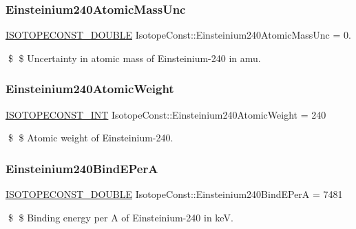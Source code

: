 \subsubsection{\texorpdfstring{Einsteinium240\+Atomic\+Mass\+Unc}{Einsteinium240AtomicMassUnc}}
{\footnotesize\ttfamily \mbox{\hyperlink{group___isotope_const-_macros_ga8f45a7272ce02c0b4c65c44636ed719a}{I\+S\+O\+T\+O\+P\+E\+C\+O\+N\+S\+T\+\_\+\+D\+O\+U\+B\+LE}} Isotope\+Const\+::\+Einsteinium240\+Atomic\+Mass\+Unc = 0.}

\$ \$ Uncertainty in atomic mass of Einsteinium-\/240 in amu. \mbox{\label{group___isotope_const-_einsteinium-_es240_ga99563ebd8cc8f0e5631b0facb4a97aea}} 
\subsubsection{\texorpdfstring{Einsteinium240\+Atomic\+Weight}{Einsteinium240AtomicWeight}}
{\footnotesize\ttfamily \mbox{\hyperlink{group___isotope_const-_macros_ga5f18360b3e99483a35c32d789e62621c}{I\+S\+O\+T\+O\+P\+E\+C\+O\+N\+S\+T\+\_\+\+I\+NT}} Isotope\+Const\+::\+Einsteinium240\+Atomic\+Weight = 240}

\$ \$ Atomic weight of Einsteinium-\/240. \mbox{\label{group___isotope_const-_einsteinium-_es240_ga2298b5a88b4d03d93f4b3001b589309e}} 
\subsubsection{\texorpdfstring{Einsteinium240\+Bind\+E\+PerA}{Einsteinium240BindEPerA}}
{\footnotesize\ttfamily \mbox{\hyperlink{group___isotope_const-_macros_ga8f45a7272ce02c0b4c65c44636ed719a}{I\+S\+O\+T\+O\+P\+E\+C\+O\+N\+S\+T\+\_\+\+D\+O\+U\+B\+LE}} Isotope\+Const\+::\+Einsteinium240\+Bind\+E\+PerA = 7481}

\$ \$ Binding energy per A of Einsteinium-\/240 in keV. \mbox{\label{group___isotope_const-_einsteinium-_es240_ga5d315f3a68b38fac0c15861be102b855}} 

